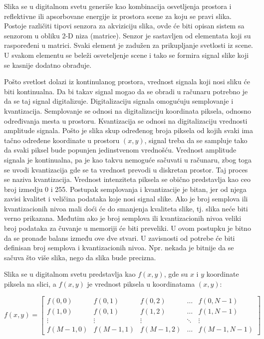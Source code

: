 \documentclass[a4paper,12pt,titlepage]{article}
\begin{document}
Slika se u digitalnom svetu generiše kao kombinacija osvetljenja prostora i reflektivne ili apsorbovane energije iz prostora scene za koju se pravi slika. Postoje različiti tipovi senzora za akviziciju slika, ovde će biti opisan sistem sa senzorom u obliku 2-D niza (matrice). Senzor je sastavljen od elementata koji su raspoređeni u matrici. Svaki element je zadužen za prikupljanje svetlosti iz scene. U svakom elementu se beleži osveteljenje scene i tako se formira signal slike koji se kasnije dodatno obrađuje.

Pošto svetlost dolazi iz kontinulanog prostora, vrednost signala koji nosi sliku će biti kontinualna. Da bi takav signal mogao da se obradi u računaru potrebno je da se taj signal digitalizuje. Digitalizaciju signala omogućuju semplovanje i kvantizacija. Semplovanje se odnosi na digitalizaciju koordinata piksela, odnosno određivanja mesta u prostoru. Kvantizacija se odnosi na digitalizaciju vrednosti amplitude signala. Pošto je slika skup određenog broja piksela od kojih svaki ima tačno određene koordinate u prostoru $(x, y)$, signal treba da se sampluje tako da svaki piksel bude popunjen jedinstvenom vrednošću. Vrednost amplitude signala je kontinualna, pa je kao takvu nemoguće sačuvati u računaru, zbog toga se uvodi kvantizacija gde se ta vrednost prevodi u diskretan prostor. Taj proces se naziva kvantizacija. Vrednost intenziteta piksela se obično predstavlja kao ceo broj izmedju 0 i 255. Postupak semplovanja i kvantizacije je bitan, jer od njega zavisi kvalitet i veličina podataka koje nosi signal slike. Ako je broj semplova ili kvantizacionih nivoa mali doći će do smanjenja kvaliteta slike, tj. slika neće biti verno prikazana. Međutim ako je broj  semplova ili kvantizacionih nivoa veliki broj podataka za čuvanje u memoriji će biti preveliki. U ovom postupku je bitno da se pronađe balans između ove dve stvari. U zavisnosti od potrebe će biti definisan broj semplova i kvantizacionih nivoa. Npr. nekada je bitnije da se sačuva što više slika, nego da slika bude precizna. 

Slika se u digitalnom svetu predstavlja kao $f(x, y)$, gde su $x$ i $y$ koordinate piksela na slici, a $f(x, y)$ je vrednost piksela u koordinatama $(x, y)$:

\begin{equation}\label{eq:slika}
f(x, y)
=
\begin{bmatrix}
    f(0, 0) & f(0, 1) & f(0, 2) & \dots  & f(0, N - 1) \\
    f(1, 0) & f(0, 1) & f(1, 2) & \dots  & f(1, N - 1) \\
    \vdots & \vdots & \vdots & \ddots & \vdots \\
    f(M - 1, 0) & f(M - 1, 1) & f(M - 1, 2) & \dots  & f(M - 1, N - 1)
\end{bmatrix}
\end{equation}
\end{document}
